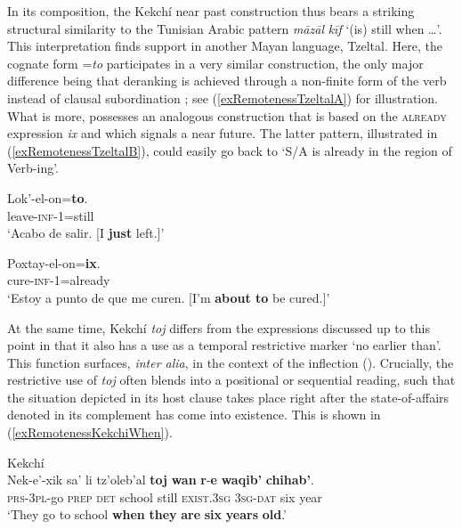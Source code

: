 In its composition, the Kekchí near past construction thus bears a striking structural similarity to the Tunisian Arabic pattern \textit{māzāl} \mbox{\textit{kī}\textit{f}} \lq (is) still when …\rq{}. This interpretation finds support in another Mayan language, Tzeltal. Here, the cognate form \mbox{=\textit{to}} participates in a very similar construction, the only major difference being that deranking is achieved through a non-finite form of the verb instead of clausal subordination \parencite[653–656]{Polian2013}; see (\ref{exRemotenessTzeltalA}) for illustration. What is more,  possesses an analogous construction that is based on the \textsc{already} expression \textit{ix} and which signals a near future. The latter pattern, illustrated in (\ref{exRemotenessTzeltalB}), could easily go back to \lq S/A is already in the region of Verb-ing\rq{}.

\begin{exe}
	\ex 
	\begin{xlist}
		\exi{}
		\ex \gll Lok\rq{}-el-on=\textbf{to}.\label{exRemotenessTzeltalA}\\
		leave-\textsc{inf}-1=still\\
		\glt \lq Acabo de salir. [I \textbf{just} left.]\rq{}
		
		\ex{}
		\gll Poxtay-el-on=\textbf{ix}.\label{exRemotenessTzeltalB}\\
		cure-\textsc{inf}-1=already\\
		\glt \lq Estoy a punto de que me curen. [I'm \textbf{about to} be cured.]\rq{}
		\\\parencite[654]{Polian2013}
	\end{xlist}
\end{exe}

At the same time, Kekchí \textit{toj} differs from the expressions discussed up to this point in that it also has a use as a temporal restrictive marker \lq no earlier than\rq{}. This function surfaces, \textit{inter alia}, in the context of the   inflection (). Crucially, the restrictive use of \textit{toj} often blends into a positional or sequential reading, such that the situation depicted in its host clause takes place right after the state-of-affairs denoted in its complement has come into existence. This is shown in (\ref{exRemotenessKekchiWhen}).

\begin{exe}
\ex Kekchí\label{exRemotenessKekchiWhen}\\
	\gll Nek-e'-xik sa' li tz'oleb'al \textbf{toj} \textbf{wan} \textbf{r}-\textbf{e} \textbf{waqib'} \textbf{chihab'}.\\
	\textsc{prs}-3\textsc{pl}-go \textsc{prep} \textsc{det} school still \textsc{exist}.3\textsc{sg} 3\textsc{sg}-\textsc{dat} six year\\
	\glt \lq They go to school \textbf{when} \textbf{they} \textbf{are} \textbf{six} \textbf{years} \textbf{old}.' \parencite[466]{Kockelman2020}
\end{exe}

